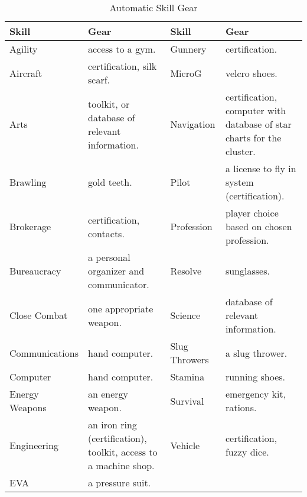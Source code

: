 \begin{table*}[htb]
\centering
\begin{tabular}{*2{lp{}}}
\toprule
Skill		& Gear &
Skill		& Gear \\
\midrule
Agility		& access to a gym. &
Gunnery		& certification. \\
Aircraft	& certification, silk scarf. &
MicroG		& velcro shoes. \\
Arts		& toolkit, or database of relevant information. &
Navigation	& certification, computer with database of star charts for the cluster. \\
Brawling	& gold teeth. &
Pilot		& a license to fly in system (certification). \\
Brokerage	& certification, contacts. &
Profession	& player choice based on chosen profession. \\
Bureaucracy	& a personal organizer and communicator. &
Resolve		& sunglasses. \\
Close Combat	& one appropriate weapon. &
Science		& database of relevant information. \\
Communications	& hand computer. &
Slug Throwers	& a slug thrower. \\
Computer	& hand computer. &
Stamina		& running shoes. \\
Energy Weapons	& an energy weapon. &
Survival	& emergency kit, rations. \\
Engineering	& an iron ring (certification), toolkit, access to a machine shop. &
Vehicle		& certification, fuzzy dice.\\
EVA		& a pressure suit. \\
\bottomrule
\end{tabular}
\caption{Automatic Skill Gear}
\label{tab:automatic-skill-gear}
\end{table*}
